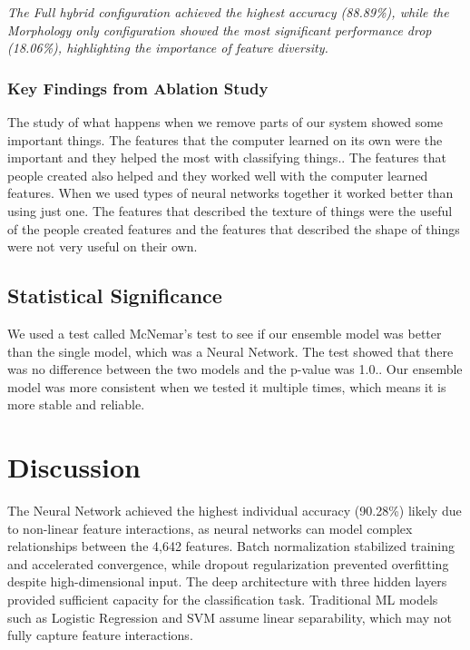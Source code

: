 \documentclass[journal,article,submit,pdftex,moreauthors]{Definitions/mdpi}
\begin{document}
\emph{The Full hybrid configuration achieved the highest accuracy (88.89\%), while the Morphology only configuration showed the most significant performance drop (18.06\%), highlighting the importance of feature diversity.}


\subsubsection{\textbf{ Key Findings from Ablation Study}}

The study of what happens when we remove parts of our system showed some important things. The features that the computer learned on its own were the important and they helped the most with classifying things.. The features that people created also helped and they worked well with the computer learned features. When we used types of neural networks together it worked better than using just one. The features that described the texture of things were the useful of the people created features and the features that described the shape of things were not very useful on their own.


\subsection{\textbf{Statistical Significance}}
We used a test called McNemar’s test to see if our ensemble model was better than the single model, which was a Neural Network. The test showed that there was no difference between the two models and the p-value was 1.0.. Our ensemble model was more consistent when we tested it multiple times, which means it is more stable and reliable.

\section{Discussion}

The Neural Network achieved the highest individual accuracy (90.28\%) likely due to 
non-linear feature interactions, as neural networks can model complex relationships 
between the 4,642 features. Batch normalization stabilized training and accelerated 
convergence, while dropout regularization prevented overfitting despite 
high-dimensional input. The deep architecture with three hidden layers provided 
sufficient capacity for the classification task. Traditional ML models such as Logistic 
Regression and SVM assume linear separability, which may not fully capture feature 
interactions. 
\end{document}
